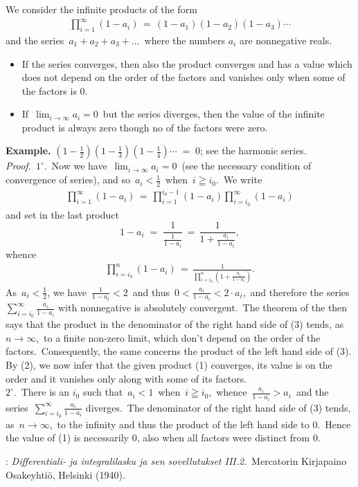 \documentclass[12pt]{article}
\theoremstyle{definition}
\begin{document}

We consider the infinite products of the form
\begin{align}
\prod_{i=1}^\infty(1\!-\!a_i) \,=\, (1\!-\!a_1)(1\!-\!a_2)(1\!-\!a_3)\cdots
\end{align}
and the series \,$a_1\!+\!a_2\!+\!a_3\!+\ldots$\, where the numbers $a_i$ are nonnegative reals.
\begin{itemize}
\item If the series converges, then also the product converges and has a value which does not depend on the order of the factors and vanishes only when some of the factors is 0.
\item If\, $\displaystyle\lim_{i\to\infty}a_i = 0$\, but the series diverges, then the value of the infinite product is always zero  though no of the factors were zero.
\end{itemize}

\textbf{Example.}\; $(1\!-\!\frac{1}{2})(1\!-\!\frac{1}{3})(1\!-\!\frac{1}{4})\cdots \;=\; 0$;\; see the harmonic series.\\

{\em Proof.}\, $1^\circ$.\, Now we have\, $\displaystyle\lim_{i\to\infty}a_i = 0$\, (see the necessary condition of convergence of series), and so\, $a_i < \frac{1}{2}$\, when\, $i \geqq i_0$.\, We write
\begin{align}
\prod_{i=1}^\infty(1\!-\!a_i) \,=\, \prod_{i=1}^{i_0-1}(1\!-\!a_i)\prod_{i=i_0}^\infty(1\!-\!a_i)
\end{align}
and set in the last product
$$1\!-\!a_i \;=\; \frac{1}{\frac{1}{1\!-\!a_i}} \,=\, \frac{1}{1+\frac{a_i}{1\!-\!a_i}},$$
whence 
\begin{align}
\prod_{i=i_0}^n (1\!-\!a_i) \,=\, \frac{1}{ \prod_{i=i_0}^n\left(1+\frac{a_i}{1\!-\!a_i}\right) }.
\end{align}
As\, $a_i < \frac{1}{2}$, we have\, $\displaystyle\frac{1}{1\!-\!a_i} < 2$\, and thus\, 
$\displaystyle 0 < \frac{a_i}{1\!-\!a_i} < 2\cdot a_i$,\, and therefore the series
$\displaystyle \sum_{i=i_0}^\infty \frac{a_i}{1\!-\!a_i}$ with nonnegative  is absolutely convergent.\, The theorem of the  then says that the product in the denominator of the right hand side of (3) tends, as\, $n \to \infty$,\, to a finite non-zero limit,  which don't depend on the order of the factors.\, Consequently, the same concerns the product of the left hand side of (3).\, By (2), we now infer that the given product (1) converges, its value is  on the order and it vanishes only along with some of its factors.\\
$2^\circ$.\, There is an $i_0$ such that\, $a_i < 1$\, when\, $i \geqq i_0$,\, whence\, $\frac{a_i}{1\!-\!a_i} > a_i$\, and the series\, $\displaystyle \sum_{i=i_0}^\infty\frac{a_i}{1\!-\!a_i}$ diverges.\, The denominator of the right hand side of (3) tends, as\, $n \to \infty$,\, to the infinity and thus the product of the left hand side to 0.\, Hence the value of (1) is necessarily 0, also when all factors were distinct from 0.

\begin{thebibliography}{8}
: {\em Differentiali- ja integralilasku
ja sen sovellutukset III.2}.\, Mercatorin Kirjapaino Osakeyhti\"o, Helsinki (1940).
\end{thebibliography}
\end{document}
